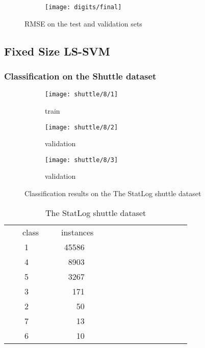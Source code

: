 \documentclass[conference,compsoc]{IEEEtran}
\begin{document}
\begin{figure*}[htb]
    \centering %
\begin{subfigure}{0.45\textwidth}
  \texttt{[image: digits/final]}
\end{subfigure}\hfil %
\caption{RMSE on the test and validation sets }
\label{fig:kpca6}
\end{figure*}


\subsection{Fixed Size LS-SVM}

\subsubsection{Classification on the Shuttle dataset}
\begin{figure}
\begin{subfigure}{0.33\textwidth}
  \texttt{[image: shuttle/8/1]}
 \caption{train}
  \label{fig:4}
\end{subfigure}\hfil %
\begin{subfigure}{0.33\textwidth}
  \texttt{[image: shuttle/8/2]}
 \caption{validation}
  \label{fig:5}
\end{subfigure}\hfil %
\begin{subfigure}{0.33\textwidth}
  \texttt{[image: shuttle/8/3]}
 \caption{validation}
  \label{fig:5}
\end{subfigure}\hfil %
\caption{Classification results on the The StatLog shuttle dataset }
\label{fig:shuttle}
\end{figure}


\begin{table}\centering
\begin{tabular}{@{}rrrrrrrrrrccrrrcrrr@{}}\toprule
& \multicolumn{4}{c}{class} & \phantom{abc}& \multicolumn{2}{c}{instances} &
\phantom{abc} \\

&   &     1&   &&  &45586 &  \\
  &   &  4 &   &&  &     8903 &  \\
&   &  5 &   &&  &   3267 &  \\
    &   & 3 &   &&  & 171&  \\
    &   & 2&   &&  &   50 &  \\
    &   &  7 &   &&  &  13 &  \\
 &   & 6 &   &&  &  10 &  \\

\bottomrule
\end{tabular}

\caption{The StatLog shuttle dataset}
       \label{ref:shuttle}
\end{table} 
\end{document}

